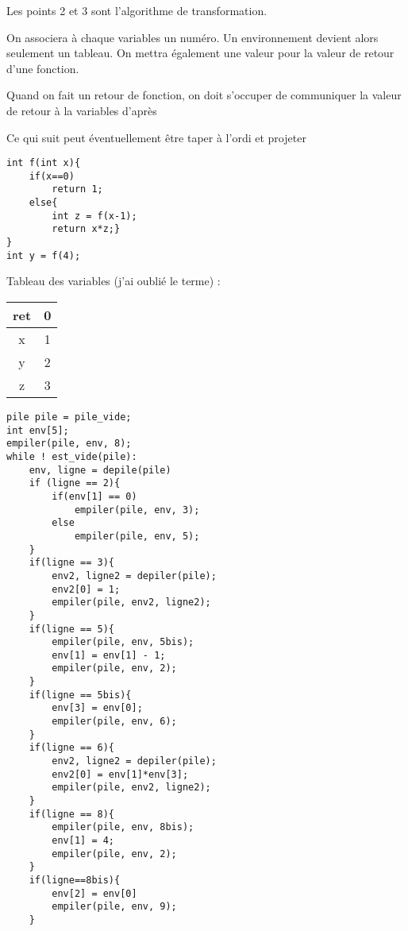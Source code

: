 Les points 2 et 3 sont l'algorithme de transformation.

On associera à chaque variables un numéro. Un environnement devient alors seulement un tableau. On mettra également une valeur pour la valeur de retour d'une fonction.

Quand on fait un retour de fonction, on doit s'occuper de communiquer la valeur de retour à la variables d'après

\begin{com}
	Ce qui suit peut éventuellement être taper à l'ordi et projeter
\end{com}

\begin{minipage}{0.3\linewidth}
\begin{lstlisting}[style=CStyle]
int f(int x){
    if(x==0)
        return 1;
    else{
        int z = f(x-1);
        return x*z;}
}
int y = f(4);
\end{lstlisting}
\end{minipage}
\enspace Tableau des variables (j'ai oublié le terme) : \begin{tabular}{|c|c|}
	\hline ret & 0 \\ \hline
	x & 1 \\ \hline
	y & 2 \\ \hline
	z & 3 \\ \hline
\end{tabular}

\begin{lstlisting}[style=CStyle]
pile pile = pile_vide;
int env[5];
empiler(pile, env, 8);
while ! est_vide(pile):
    env, ligne = depile(pile)
    if (ligne == 2){
        if(env[1] == 0)
            empiler(pile, env, 3);
        else
            empiler(pile, env, 5);
    }
    if(ligne == 3){
        env2, ligne2 = depiler(pile);
        env2[0] = 1;
        empiler(pile, env2, ligne2);
    }
    if(ligne == 5){
        empiler(pile, env, 5bis);
        env[1] = env[1] - 1;
        empiler(pile, env, 2);
    }
    if(ligne == 5bis){
        env[3] = env[0];
        empiler(pile, env, 6);
    }
    if(ligne == 6){
        env2, ligne2 = depiler(pile);
        env2[0] = env[1]*env[3];
        empiler(pile, env2, ligne2);
    }
    if(ligne == 8){
        empiler(pile, env, 8bis);
        env[1] = 4;
        empiler(pile, env, 2);
    }
    if(ligne==8bis){
        env[2] = env[0]
        empiler(pile, env, 9);
    }
\end{lstlisting}